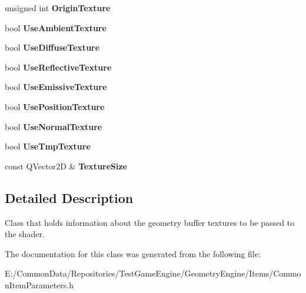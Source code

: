 \begin{DoxyCompactItemize}
unsigned int {\bfseries Origin\+Texture}
\item 
\mbox{\label{class_geometry_engine_1_1_g_buffer_texture_info_a52a4306fea393953571f0d6b7436105d}} 
bool {\bfseries Use\+Ambient\+Texture}
\item 
\mbox{\label{class_geometry_engine_1_1_g_buffer_texture_info_a6a2826cc837bacdd679af056d98d55b4}} 
bool {\bfseries Use\+Diffuse\+Texture}
\item 
\mbox{\label{class_geometry_engine_1_1_g_buffer_texture_info_a58dfdab3c9b2015639b6b6734f447817}} 
bool {\bfseries Use\+Reflective\+Texture}
\item 
\mbox{\label{class_geometry_engine_1_1_g_buffer_texture_info_a839a370b51863dcede4ade7aa0c3bcc3}} 
bool {\bfseries Use\+Emissive\+Texture}
\item 
\mbox{\label{class_geometry_engine_1_1_g_buffer_texture_info_af7857a51710f4de7a7b23708f1cef12c}} 
bool {\bfseries Use\+Position\+Texture}
\item 
\mbox{\label{class_geometry_engine_1_1_g_buffer_texture_info_aef8eef842f157dc28cb5aec17f6ef53f}} 
bool {\bfseries Use\+Normal\+Texture}
\item 
\mbox{\label{class_geometry_engine_1_1_g_buffer_texture_info_a1edf755a62c1455819a07b5b48bc9458}} 
bool {\bfseries Use\+Tmp\+Texture}
\item 
\mbox{\label{class_geometry_engine_1_1_g_buffer_texture_info_a3350a95b39b831c2d8196ff7f1239f33}} 
const Q\+Vector2D \& {\bfseries Texture\+Size}
\end{DoxyCompactItemize}


\subsection{Detailed Description}
Class that holds information about the geometry buffer textures to be passed to the shader. 

The documentation for this class was generated from the following file\+:\begin{DoxyCompactItemize}
\item 
E\+:/\+Common\+Data/\+Repositories/\+Test\+Game\+Engine/\+Geometry\+Engine/\+Items/Common\+Item\+Parameters.\+h\end{DoxyCompactItemize}
